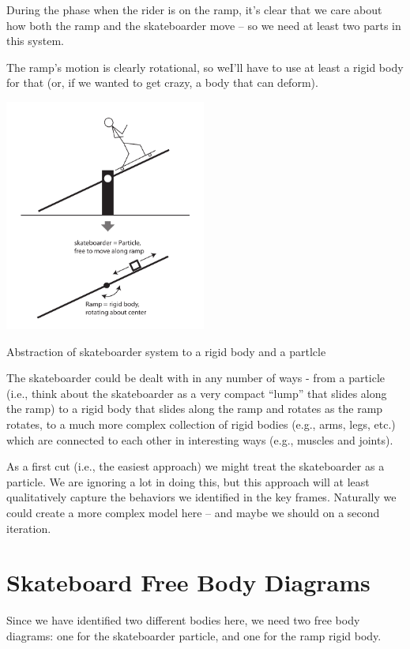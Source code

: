  During the phase when the rider is on the ramp, it's clear that we care about how both the ramp and the skateboarder move -- so we need at least two parts in this system. 

The ramp's motion is clearly rotational, so weI'll have to use at least a rigid body for that (or, if we wanted to get crazy, a body that can deform).

\begin{marginfigure}
\includegraphics[height=3in]{figs/skateboardabstraction1nocoords}
\caption{Abstraction of skateboarder system to a rigid body and a partlcle}
\end{marginfigure}

The skateboarder could be dealt with in any number of ways - from a particle (i.e., think about the skateboarder as a very compact ``lump'' that slides along the ramp) to a rigid body that slides along the ramp and rotates as the ramp rotates, to a much more complex collection of rigid bodies (e.g., arms, legs, etc.) which are connected to each other in interesting ways (e.g., muscles and joints).


As a first cut (i.e., the easiest approach) we might treat the skateboarder as a particle.  We are ignoring a lot in doing this, but this approach will at least qualitatively capture the behaviors we identified in the key frames.  Naturally we could create a more complex model here -- and maybe we should on a second iteration.



\section{Skateboard Free Body Diagrams}

Since we have identified two different bodies here,  we need two free body diagrams:  one for the skateboarder particle, and one for the ramp rigid body.

